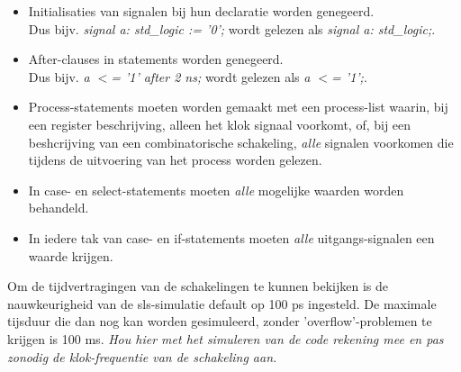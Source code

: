 \begin{itemize}
\item Initialisaties van signalen bij hun declaratie worden genegeerd.\\
      Dus bijv. {\it signal a: std\_logic := '0';} wordt gelezen
      als {\it signal a: std\_logic;}.
\item After-clauses in statements worden genegeerd.\\
      Dus bijv. {\it a $<$= '1' after 2 ns;} wordt gelezen als {\it a $<$= '1';}.
\item Process-statements moeten worden gemaakt met een process-list
      waarin, bij een register beschrijving, alleen het klok signaal voorkomt,
      of, bij een beshcrijving van een combinatorische schakeling, {\it alle} 
      signalen voorkomen die tijdens de uitvoering van
      het process worden gelezen.
\item In case- en select-statements moeten {\it alle} mogelijke waarden
      worden behandeld.
\item In iedere tak van case- en if-statements moeten {\it alle}
      uitgangs-signalen een waarde krijgen.
\end{itemize}
Om de tijdvertragingen van de schakelingen te kunnen bekijken is de
nauwkeurigheid van de sls-simulatie default op 100 ps ingesteld.
De maximale tijsduur die dan nog kan worden gesimuleerd, zonder
'overflow'-problemen te krijgen is 100 ms.
{\it Hou hier met het simuleren van de  code rekening mee en pas zonodig
de klok-frequentie van de schakeling aan.}
